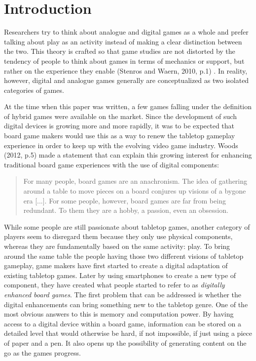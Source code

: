 \chapter{Introduction}
Researchers try to think about analogue and digital games as a whole and prefer talking about play as an activity instead of making a clear distinction between the two. This theory is crafted so that game studies are not distorted by the tendency of people to think about games in terms of mechanics or support, but rather on the experience they enable (Stenros and Waern, 2010, p.1) \cite{art:stenroswaern}. In reality, however, digital and analogue games generally are conceptualized as two isolated categories of games.

At the time when this paper was written, a few games falling under the definition of hybrid games were available on the market. Since the development of such digital devices is growing more and more rapidly, it was to be expected that board game makers would use this as a way to renew the tabletop gameplay experience in order to keep up with the evolving video game industry. Woods (2012, p.5) \cite{book:euro} made a statement that can explain this growing interest for enhancing traditional board game experiences with the use of digital components:

\begin{quotation}
For many people, board games are an anachronism. The idea of gathering around a table to move pieces on a board conjures up visions of a bygone era [...]. For some people, however, board games are far from being redundant. To them they are a hobby, a passion, even an obsession.
\end{quotation}

While some people are still passionate about tabletop games, another category of players seem to disregard them because they only use physical components, whereas they are fundamentally based on the same activity: play. To bring around the same table the people having those two different visions of tabletop gameplay, game makers have first started to create a digital adaptation of existing tabletop games. Later by using smartphones to create a new type of component, they have created what people started to refer to as \textit{digitally enhanced board games}. The first problem that can be addressed is whether the digital enhancements can bring something new to the tabletop genre. One of the most obvious answers to this is memory and computation power. By having access to a digital device within a board game, information can be stored on a detailed level that would otherwise be hard, if not impossible, if just using a piece of paper and a pen. 
It also opens up the possibility of generating content on the go as the games progress. 


